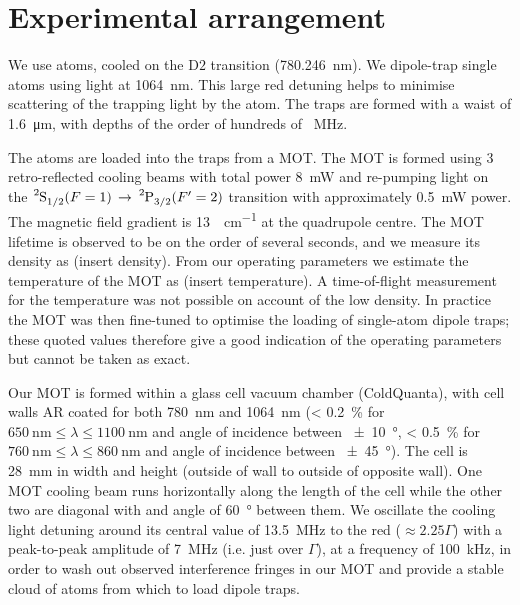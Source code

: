 \documentclass[../Thesis-IJspeert.tex]{subfiles}
\begin{document}
\fi


\iffalse
\section{Experimental arrangement}

We use  atoms, cooled on the $\mathrm{D}2$ transition (\SI{780.246}{\nm}). We dipole-trap single atoms using light at \SI{1064}{\nm}. This large red detuning helps to minimise scattering of the trapping light by the atom. The traps are formed with a waist of  \SI{1.6}{\um}, with depths of the order of hundreds of \SI{}{MHz}.

The atoms are loaded into the traps from a MOT. The MOT is formed using $3$ retro-reflected cooling beams with total power \SI{8}{\milli\watt} and re-pumping light on the $\ce{^2S_{1/2}} (F=1) \, \rightarrow \, \ce{^2P_{3/2}} (F'=2)$ transition with approximately \SI{0.5}{\milli\watt} power. The magnetic field gradient is \SI{13}{\gauss\per\cm} at the quadrupole centre. The MOT lifetime is observed to be on the order of several seconds, and we measure its density as (insert density). From our operating parameters we estimate the temperature of the MOT as (insert temperature). A time-of-flight measurement for the temperature was not possible on account of the low density. In practice the MOT was then fine-tuned to optimise the loading of single-atom dipole traps; these quoted values therefore give a good indication of the operating parameters but cannot be taken as exact.

Our MOT is formed within a glass cell vacuum chamber (ColdQuanta), with cell walls AR coated for both \SI{780}{\nm} and \SI{1064}{\nm} (\SI{< 0.2}{\percent} for $\SI{650}{\nm} \leq \lambda \leq \SI{1100}{\nm}$ and angle of incidence between \SI{\pm 10}{\degree}, \SI{< 0.5}{\percent} for $\SI{760}{\nm} \leq \lambda \leq \SI{860}{\nm}$ and angle of incidence between \SI{\pm 45}{\degree}). The cell is \SI{28}{\mm} in width and height (outside of wall to outside of opposite wall). One MOT cooling beam runs horizontally along the length of the cell while the other two are diagonal with and angle of \SI{60}{\degree} between them. We oscillate the cooling light detuning around its central value of \SI{13.5}{\MHz} to the red ($\approx 2.25 \Gamma$) with a peak-to-peak amplitude of \SI{7}{\MHz} (i.e. just over $\Gamma$), at a frequency of \SI{100}{\kHz}, in order to wash out observed interference fringes in our MOT and provide a stable cloud of atoms from which to load dipole traps.
\end{document}
